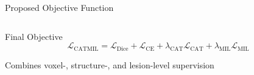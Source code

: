 \documentclass[10pt,aspectratio=169]{beamer}
\begin{document}
\begin{frame}{Proposed Objective Function}
\begin{columns}[T,totalwidth=\textwidth]
\end{columns}

\vspace{0.4cm}

\begin{block}{\centering Final Objective}
\small
\[
\mathcal{L}_{\mathrm{CATMIL}} =
\mathcal{L}_{\mathrm{Dice}} + \mathcal{L}_{\mathrm{CE}}
+ \lambda_{\mathrm{CAT}} \mathcal{L}_{\mathrm{CAT}}
+ \lambda_{\mathrm{MIL}} \mathcal{L}_{\mathrm{MIL}}
\]
\end{block}

\vspace{-0.2cm}
\centering
{\scriptsize Combines voxel-, structure-, and lesion-level supervision}

\end{frame}
\end{document}
